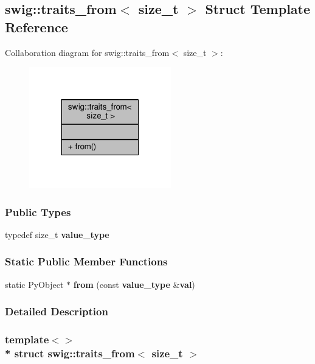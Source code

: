 \subsection{swig\+:\+:traits\+\_\+from$<$ size\+\_\+t $>$ Struct Template Reference}
\label{structswig_1_1traits__from_3_01size__t_01_4}


Collaboration diagram for swig\+:\+:traits\+\_\+from$<$ size\+\_\+t $>$\+:
\nopagebreak
\begin{figure}[H]
\begin{center}
\leavevmode
\includegraphics[width=175pt]{d6/db1/structswig_1_1traits__from_3_01size__t_01_4__coll__graph}
\end{center}
\end{figure}
\subsubsection*{Public Types}
\begin{DoxyCompactItemize}
\item 
typedef size\+\_\+t {\bf value\+\_\+type}
\end{DoxyCompactItemize}
\subsubsection*{Static Public Member Functions}
\begin{DoxyCompactItemize}
\item 
static Py\+Object $\ast$ {\bf from} (const {\bf value\+\_\+type} \&{\bf val})
\end{DoxyCompactItemize}


\subsubsection{Detailed Description}
\subsubsection*{template$<$$>$\\*
struct swig\+::traits\+\_\+from$<$ size\+\_\+t $>$}



